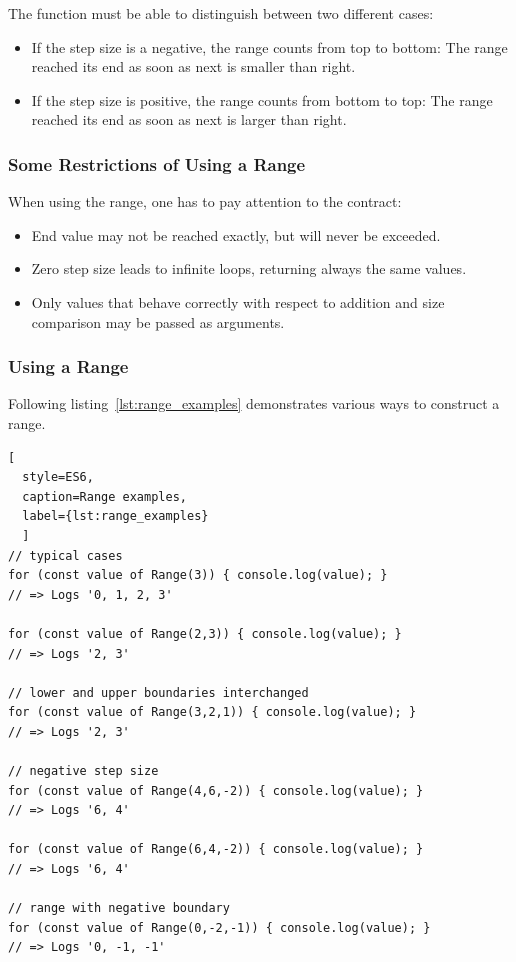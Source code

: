 The function must be able to distinguish between two different cases:

\begin{itemize}
  \item If the step size is a negative, the range counts from top to bottom:
    The range reached its end as soon as next is smaller than right.
  \item If the step size is positive, the range counts from bottom to top: The
  range reached its end as soon as next is larger than right.
\end{itemize}

\subsubsection{Some Restrictions of Using a Range}
\label{subsub:Some Restrictions of Using a Range}
When using the range, one has to pay attention to the contract:
\begin{itemize}
\item End value may not be reached exactly, but will never be exceeded.
  \item Zero step size leads to infinite loops, returning always the same values.
  \item Only values that behave correctly with respect to addition and size
    comparison may be passed as arguments.
\end{itemize}


\subsubsection{Using a Range}
\label{subsub:Using a Range}
Following listing~\ref{lst:range_examples} demonstrates various ways to
construct a range.

\begin{lstlisting}[
  style=ES6, 
  caption=Range examples,
  label={lst:range_examples}
  ]
// typical cases
for (const value of Range(3)) { console.log(value); }
// => Logs '0, 1, 2, 3'

for (const value of Range(2,3)) { console.log(value); }
// => Logs '2, 3'

// lower and upper boundaries interchanged
for (const value of Range(3,2,1)) { console.log(value); }
// => Logs '2, 3'

// negative step size
for (const value of Range(4,6,-2)) { console.log(value); }
// => Logs '6, 4'

for (const value of Range(6,4,-2)) { console.log(value); }
// => Logs '6, 4'

// range with negative boundary
for (const value of Range(0,-2,-1)) { console.log(value); }
// => Logs '0, -1, -1'
\end{lstlisting}

